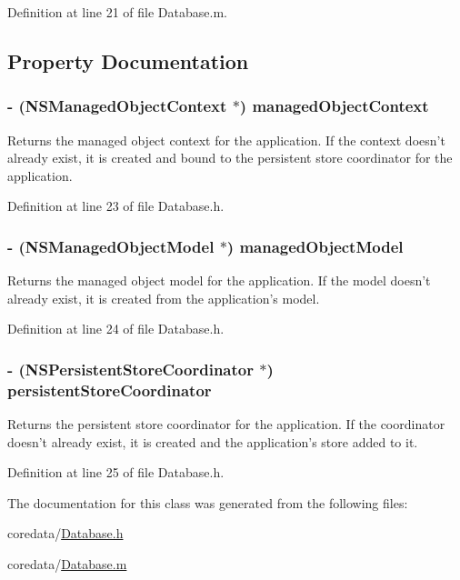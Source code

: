 Definition at line 21 of file Database.m.



\subsection{Property Documentation}
\hypertarget{interface_database_af5d2f65acff5f2c9e7e4ad472f38dfff}{
\subsubsection[{managedObjectContext}]{\setlength{\rightskip}{0pt plus 5cm}-\/ (NSManagedObjectContext $\ast$) managedObjectContext}}
\label{interface_database_af5d2f65acff5f2c9e7e4ad472f38dfff}
Returns the managed object context for the application. If the context doesn't already exist, it is created and bound to the persistent store coordinator for the application. 

Definition at line 23 of file Database.h.

\hypertarget{interface_database_a688e19e1a5eeabf38cb33bc0e0630950}{
\subsubsection[{managedObjectModel}]{\setlength{\rightskip}{0pt plus 5cm}-\/ (NSManagedObjectModel $\ast$) managedObjectModel}}
\label{interface_database_a688e19e1a5eeabf38cb33bc0e0630950}
Returns the managed object model for the application. If the model doesn't already exist, it is created from the application's model. 

Definition at line 24 of file Database.h.

\hypertarget{interface_database_a11b8c3b6ec8fa5f88cd057beec16a166}{
\subsubsection[{persistentStoreCoordinator}]{\setlength{\rightskip}{0pt plus 5cm}-\/ (NSPersistentStoreCoordinator $\ast$) persistentStoreCoordinator}}
\label{interface_database_a11b8c3b6ec8fa5f88cd057beec16a166}
Returns the persistent store coordinator for the application. If the coordinator doesn't already exist, it is created and the application's store added to it. 

Definition at line 25 of file Database.h.



The documentation for this class was generated from the following files:\begin{DoxyCompactItemize}
\item 
coredata/\hyperlink{_database_8h}{Database.h}\item 
coredata/\hyperlink{_database_8m}{Database.m}\end{DoxyCompactItemize}
